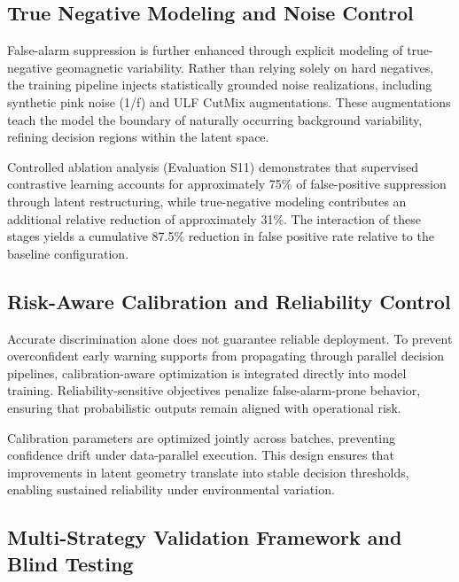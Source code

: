 \documentclass[a4paper,fleqn]{cas-sc}
\begin{document}
\subsection{True Negative Modeling and Noise Control}

False-alarm suppression is further enhanced through explicit modeling of true-negative geomagnetic variability. Rather than relying solely on hard negatives, the training pipeline injects statistically grounded noise realizations, including synthetic pink noise (1/f) and ULF CutMix augmentations. These augmentations teach the model the boundary of naturally occurring background variability, refining decision regions within the latent space.

Controlled ablation analysis (Evaluation S11) demonstrates that supervised contrastive learning accounts for approximately 75\% of false-positive suppression through latent restructuring, while true-negative modeling contributes an additional relative reduction of approximately 31\%. The interaction of these stages yields a cumulative 87.5\% reduction in false positive rate relative to the baseline configuration.

\subsection{Risk-Aware Calibration and Reliability Control}

Accurate discrimination alone does not guarantee reliable deployment. To prevent overconfident early warning supports from propagating through parallel decision pipelines, calibration-aware optimization is integrated directly into model training. Reliability-sensitive objectives penalize false-alarm-prone behavior, ensuring that probabilistic outputs remain aligned with operational risk.

Calibration parameters are optimized jointly across batches, preventing confidence drift under data-parallel execution. This design ensures that improvements in latent geometry translate into stable decision thresholds, enabling sustained reliability under environmental variation.

\subsection{Multi-Strategy Validation Framework and Blind Testing}
\end{document}
